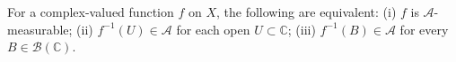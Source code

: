 For a complex-valued function $f$ on $X$, the following are equivalent:
(i) $f$ is $\mathcal{A}$-measurable;
(ii) $f^{-1}(U) \in \mathcal{A}$ for each open $U \subset \mathbb{C}$;
(iii) $f^{-1}(B) \in \mathcal{A}$ for every $B \in \mathcal{B}(\mathbb{C})$.